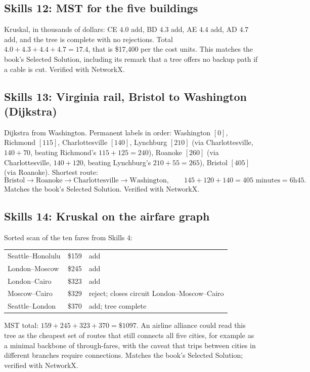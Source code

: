 \subsection*{Skills 12: MST for the five buildings}

Kruskal, in thousands of dollars: CE $4.0$ add, BD $4.3$ add, AE $4.4$ add, AD $4.7$ add, and the tree is complete with no rejections. Total $4.0 + 4.3 + 4.4 + 4.7 = 17.4$, that is \$17{,}400 per the cost units. This matches the book's Selected Solution, including its remark that a tree offers no backup path if a cable is cut. Verified with NetworkX.

\subsection*{Skills 13: Virginia rail, Bristol to Washington (Dijkstra)}

Dijkstra from Washington. Permanent labels in order: Washington $[0]$, Richmond $[115]$, Charlottesville $[140]$, Lynchburg $[210]$ (via Charlottesville, $140+70$, beating Richmond's $115+125 = 240$), Roanoke $[260]$ (via Charlottesville, $140+120$, beating Lynchburg's $210+55 = 265$), Bristol $[405]$ (via Roanoke). Shortest route:
\[
\text{Bristol} \to \text{Roanoke} \to \text{Charlottesville} \to \text{Washington},
\qquad 145 + 120 + 140 = 405 \text{ minutes} = 6\text{h}45.
\]
Matches the book's Selected Solution. Verified with NetworkX.

\subsection*{Skills 14: Kruskal on the airfare graph}

Sorted scan of the ten fares from Skills 4:
\begin{center}
\begin{tabular}{lll}
Seattle--Honolulu & \$159 & add \\
London--Moscow & \$245 & add \\
London--Cairo & \$323 & add \\
Moscow--Cairo & \$329 & reject; closes circuit London--Moscow--Cairo \\
Seattle--London & \$370 & add; tree complete \\
\end{tabular}
\end{center}
MST total: $159 + 245 + 323 + 370 = \$1097$. An airline alliance could read this tree as the cheapest set of routes that still connects all five cities, for example as a minimal backbone of through-fares, with the caveat that trips between cities in different branches require connections. Matches the book's Selected Solution; verified with NetworkX.

